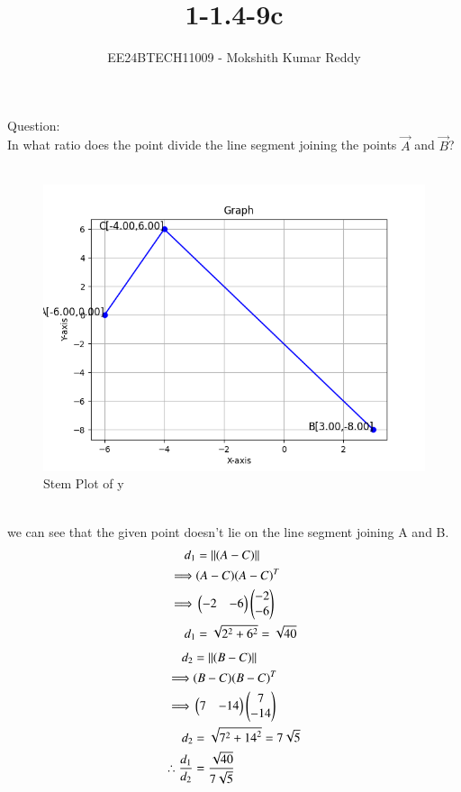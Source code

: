 \documentclass[journal]{IEEEtran}
\begin{document}

\vspace{3cm}

\title{1-1.4-9c}
\author{EE24BTECH11009 - Mokshith Kumar Reddy}
{\let\newpage\relax\maketitle}

\renewcommand{\thefigure}{\theenumi}
\renewcommand{\thetable}{\theenumi}
\setlength{\intextsep}{10pt} %


\renewcommand{\thetable}{\theenumi}
Question:\\
 In what ratio does the point  divide the line segment joining the points $\vec{A}$ and $\vec{B}$?\\
\solution\\
\begin{figure}[h!]
   \centering
   \includegraphics[width=0.7\linewidth]{figs/plot.png}
   \caption{Stem Plot of y}
   \label{stemplot}
\end{figure}\\
 we can see that the given point doesn't lie on the line segment joining A and B.\\
\begin{align}
d_1&=\left\|{(A-C)}\right\|\\
\implies& (A-C)(A-C)^T\\
\implies& \begin{pmatrix}
-2 & -6
\end{pmatrix}
\begin{pmatrix}
-2\\
-6
\end{pmatrix}\\
d_1&=\sqrt{2^2+6^2}=\sqrt{40}\\
\end{align}
\begin{align}
d_2&=\left\|{(B-C)}\right\|\\
\implies& (B-C)(B-C)^T\\
 \implies& \begin{pmatrix}
7 & -14
\end{pmatrix}
\begin{pmatrix}
7\\
-14
\end{pmatrix}\\
d_2&= \sqrt{7^2 + {14}^2} =7\sqrt{5}\\
\therefore \frac{d_1}{d_2} &= \frac{\sqrt{40}}{7\sqrt{5}}
\end{align}
\begin{table}[h]
    \centering
    
    \caption{  }
    \label{tab.1}
\end{table}
\end{document}
